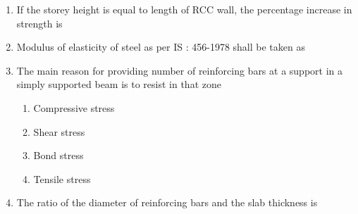 \documentclass[11pt,a4paper]{article}
\begin{document}
\begin{enumerate}
\\
\item{If the storey height is equal to length of RCC wall, the percentage increase in strength is}
\\
\item{Modulus of elasticity of steel as per IS : 456-1978 shall be taken as}
\\
\item{The main reason for providing number of reinforcing bars at a support in a simply supported beam is to resist in that zone}
\begin{enumerate}[label=\Alph*.]
\item{Compressive stress}
\item{Shear stress}
\item{Bond stress}
\item{Tensile stress}
\end{enumerate}
\item{The ratio of the diameter of reinforcing bars and the slab thickness is}
\\

\end{enumerate}
\end{document}
